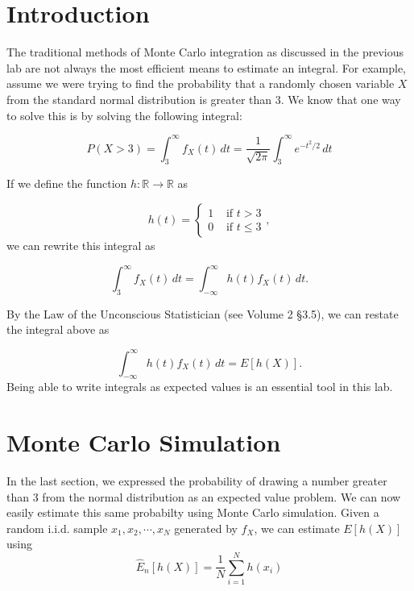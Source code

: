 \label{lab:montecarlo2}

\section*{Introduction}

The traditional methods of Monte Carlo integration as discussed in the previous lab are not always the most efficient means to estimate an integral. For example, assume we were trying to find the probability that a randomly chosen variable $X$ from the standard normal distribution is greater than $3$. We know that one way to solve this is by solving the following integral:

\begin{equation} \label{eq:integral} 
P(X > 3) = \int_{3}^{\infty} f_X(t)\,dt = \frac{1}{\sqrt{2\pi}}\int_{3}^{\infty} e^{-t^2/2}\,dt
\end{equation}

If we define the function $h: \mathbb{R} \rightarrow \mathbb{R}$ as 

$$h(t) = \begin{cases}
1 & \text{ if } t > 3 \\ 
0 & \text{ if } t \leq 3 
\end{cases}, $$
we can rewrite this integral as

\begin{equation*}
\int_{3}^{\infty} f_X(t)\,dt = \int_{-\infty}^{\infty} h(t)f_X(t)\,dt.
\end{equation*}

By the Law of the Unconscious Statistician (see Volume 2 \S 3.5), we can restate the integral above as

$$\int_{-\infty}^{\infty} h(t)f_X(t)\,dt = E[h(X)].$$
Being able to write integrals as expected values is an essential tool in this lab.

\section*{Monte Carlo Simulation}
In the last section, we expressed the probability of drawing a number greater than $3$ from the normal distribution as an expected value problem. We can now easily estimate this same probabilty using Monte Carlo simulation. 
Given a random i.i.d. sample $x_1, x_2, \cdots , x_N$ generated by $f_X$, we can estimate $E[h(X)]$ using
\begin{equation} \label{eq:estimator}
\widehat{E}_n[h(X)] = \frac{1}{N}\sum_{i = 1}^{N}h(x_i)
\end{equation}

